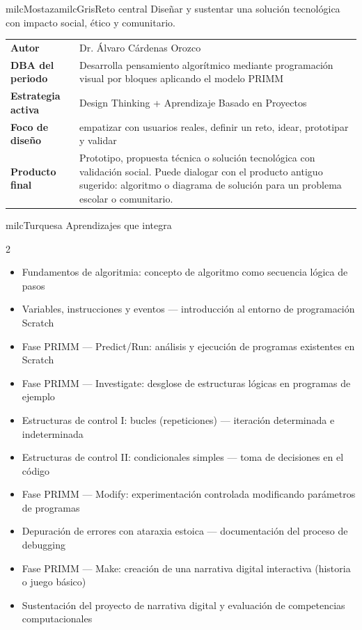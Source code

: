 \documentclass[11pt,letterpaper]{article}
\begin{document}
\begin{softbox}{milcMostaza}{milcGris}{Reto central}
Diseñar y sustentar una solución tecnológica con impacto social, ético y comunitario.
\end{softbox}

\begin{tabularx}{\textwidth}{>{\bfseries}p{3.4cm}X}
\rowcolor{milcMagenta!12}Autor & Dr. Álvaro Cárdenas Orozco\\
DBA del periodo & Desarrolla pensamiento algorítmico mediante programación visual por bloques aplicando el modelo PRIMM\\
Estrategia activa & Design Thinking + Aprendizaje Basado en Proyectos\\
Foco de diseño & empatizar con usuarios reales, definir un reto, idear, prototipar y validar\\
Producto final & Prototipo, propuesta técnica o solución tecnológica con validación social. Puede dialogar con el producto antiguo sugerido: algoritmo o diagrama de solución para un problema escolar o comunitario.\\
\end{tabularx}

\begin{titlebox}{milcTurquesa}
Aprendizajes que integra
\end{titlebox}
\begin{multicols}{2}
\begin{itemize}[leftmargin=*]
\item Fundamentos de algoritmia: concepto de algoritmo como secuencia lógica de pasos
\item Variables, instrucciones y eventos — introducción al entorno de programación Scratch
\item Fase PRIMM — Predict/Run: análisis y ejecución de programas existentes en Scratch
\item Fase PRIMM — Investigate: desglose de estructuras lógicas en programas de ejemplo
\item Estructuras de control I: bucles (repeticiones) — iteración determinada e indeterminada
\item Estructuras de control II: condicionales simples — toma de decisiones en el código
\item Fase PRIMM — Modify: experimentación controlada modificando parámetros de programas
\item Depuración de errores con ataraxia estoica — documentación del proceso de debugging
\item Fase PRIMM — Make: creación de una narrativa digital interactiva (historia o juego básico)
\item Sustentación del proyecto de narrativa digital y evaluación de competencias computacionales
\end{itemize}
\end{multicols}
\end{document}
